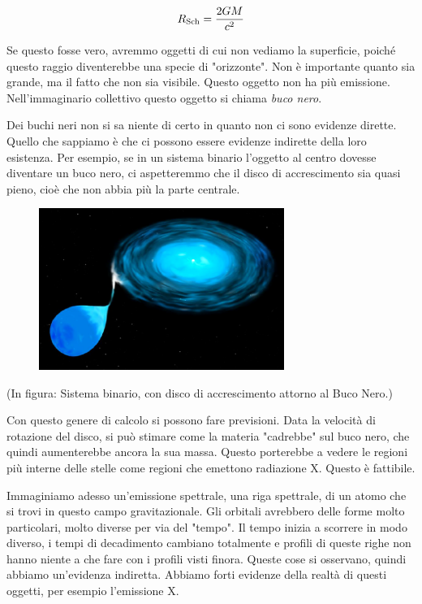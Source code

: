 $$R_{\rm Sch}=\frac{2GM}{c^2}$$

Se questo fosse vero, avremmo oggetti di cui non vediamo la superficie, poiché questo raggio diventerebbe una specie di "orizzonte". Non è importante quanto sia grande, ma il fatto che non sia visibile. Questo oggetto non ha più emissione. Nell'immaginario collettivo questo oggetto si chiama \textit{buco nero}.

Dei buchi neri non si sa niente di certo in quanto non ci sono evidenze dirette. Quello che sappiamo è che ci possono essere evidenze indirette della loro esistenza. Per esempio, se in un sistema binario l'oggetto al centro dovesse diventare un buco nero, ci aspetteremmo che il disco di accrescimento sia quasi pieno, cioè che non abbia più la parte centrale.

\begin{figure}[H]
    \centering
    \includegraphics[width=8cm]{lezione 28 novembre/discobuconero.png}
    \label{lezione 28 novembre/discobuconero.png}
\end{figure}

(In figura: Sistema binario, con disco di accrescimento attorno al Buco Nero.)

Con questo genere di calcolo si possono fare previsioni. Data la velocità di rotazione del disco, si può stimare come la materia "cadrebbe" sul buco nero, che quindi aumenterebbe ancora la sua massa. Questo porterebbe a vedere le regioni più interne delle stelle come regioni che emettono radiazione X. Questo è fattibile.

Immaginiamo adesso un'emissione spettrale, una riga spettrale, di un atomo che si trovi in questo campo gravitazionale. Gli orbitali avrebbero delle forme molto particolari, molto diverse per via del "tempo". Il tempo inizia a scorrere in modo diverso, i tempi di decadimento cambiano totalmente e profili di queste righe non hanno niente a che fare con i profili visti finora. Queste cose si osservano, quindi abbiamo un'evidenza indiretta. Abbiamo forti evidenze della realtà di questi oggetti, per esempio l'emissione X.

